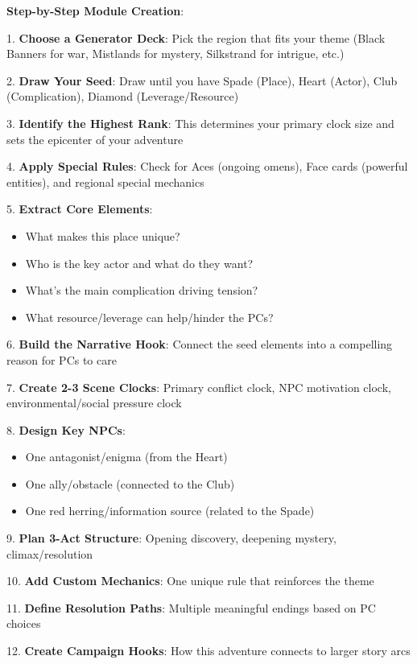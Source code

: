 \documentclass[11pt]{article}
\begin{document}
\begin{mdframed}[backgroundcolor=modulebg]
\textbf{Step-by-Step Module Creation}:

1. \textbf{Choose a Generator Deck}: Pick the region that fits your theme (Black Banners for war, Mistlands for mystery, Silkstrand for intrigue, etc.)

2. \textbf{Draw Your Seed}: Draw until you have Spade (Place), Heart (Actor), Club (Complication), Diamond (Leverage/Resource)

3. \textbf{Identify the Highest Rank}: This determines your primary clock size and sets the epicenter of your adventure

4. \textbf{Apply Special Rules}: Check for Aces (ongoing omens), Face cards (powerful entities), and regional special mechanics

5. \textbf{Extract Core Elements}:
   \begin{itemize}
   \item What makes this place unique?
   \item Who is the key actor and what do they want?
   \item What's the main complication driving tension?
   \item What resource/leverage can help/hinder the PCs?
   \end{itemize}

6. \textbf{Build the Narrative Hook}: Connect the seed elements into a compelling reason for PCs to care

7. \textbf{Create 2-3 Scene Clocks}: Primary conflict clock, NPC motivation clock, environmental/social pressure clock

8. \textbf{Design Key NPCs}: 
   \begin{itemize}
   \item One antagonist/enigma (from the Heart)
   \item One ally/obstacle (connected to the Club)
   \item One red herring/information source (related to the Spade)
   \end{itemize}

9. \textbf{Plan 3-Act Structure}: Opening discovery, deepening mystery, climax/resolution

10. \textbf{Add Custom Mechanics}: One unique rule that reinforces the theme

11. \textbf{Define Resolution Paths}: Multiple meaningful endings based on PC choices

12. \textbf{Create Campaign Hooks}: How this adventure connects to larger story arcs
\end{mdframed}
\end{document}
